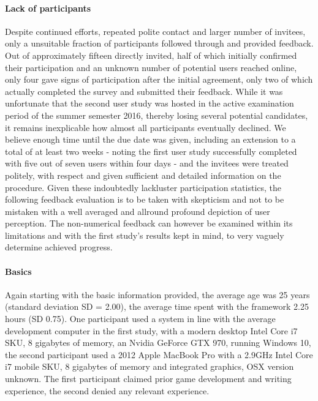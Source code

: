 \paragraph{Lack of participants} Despite continued efforts, repeated polite contact and larger number of invitees, only a unsuitable fraction of participants followed through and provided feedback. Out of approximately fifteen directly invited, half of which initially confirmed their participation and an unknown number of potential users reached online, only four gave signs of participation after the initial agreement, only two of which actually completed the survey and submitted their feedback. 
While it was unfortunate that the second user study was hosted in the active examination period of the summer semester 2016, thereby losing several potential candidates, it remains inexplicable how almost all participants eventually declined. We believe enough time until the due date was given, including an extension to a total of at least two weeks - noting the first user study successfully completed with five out of seven users within four days - and the invitees were treated politely, with respect and given sufficient and detailed information on the procedure. 
Given these indoubtedly lackluster participation statistics, the following feedback evaluation is to be taken with skepticism and not to be mistaken with a well averaged and allround profound depiction of user perception. The non-numerical feedback can however be examined within its limitations and with the first study's results kept in mind, to very vaguely determine achieved progress.
\paragraph{Basics} Again starting with the basic information provided, the average age was 25 years (standard deviation SD = 2.00), the average time spent with the framework 2.25 hours (SD 0.75). 
One participant used a system in line with the average development computer in the first study, with a modern desktop Intel Core i7 SKU, 8 gigabytes of memory, an Nvidia GeForce GTX 970, running Windows 10, the second participant used a 2012 Apple MacBook Pro with a 2.9GHz Intel Core i7 mobile SKU, 8 gigabytes of memory and integrated graphics, OSX version unknown.
The first participant claimed prior game development and writing experience, the second denied any relevant experience.
